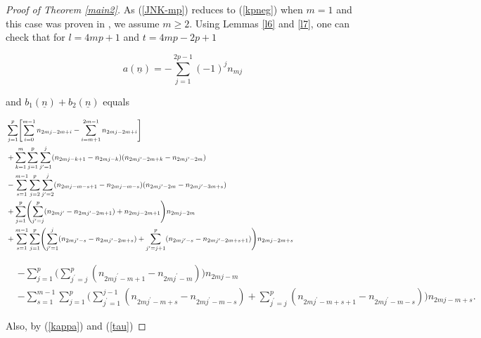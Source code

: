 \documentclass[11pt,reqno]{amsart}
\theoremstyle{definition}
\numberwithin{equation}{section}
\begin{document}
\begin{proof}[Proof of Theorem \ref{main2}]
As (\ref{JNK-mp}) reduces to (\ref{kpneg}) when $m=1$ and this case was proven in \cite{takata}, we assume $m \geq 2$. Using Lemmas \ref{l6} and \ref{l7}, one can check that for $l=4mp+1$ and $t=4mp-2p+1$

\begin{equation} \label{a1}
a({\underline{n}}) = - \sum_{j=1}^{2p - 1} (-1)^j n_{mj}
\end{equation}

\noindent and $b_1({\underline{n}}) + b_2({\underline{n}})$ equals

\begin{equation*}
\begin{aligned}
& \sum_{j=1}^{p} \Biggl[ \sum_{i=0}^{m-1} n_{2mj - 2m + i} - \sum_{i=m+1}^{2m-1} n_{2mj-2m+i} \Biggr] \\
& + \sum_{k=1}^{m} \sum_{j=1}^{p} \sum_{j^{\prime}=1}^{j} (n_{2mj-k+1} - n_{2mj-k})(n_{2mj^{\prime} - 2m + k} - n_{2mj^{\prime} - 2m})  \hphantom{xxxxxxxxxxxxxxxxxxxxxxxxxxxxxxxxxxxx} \\
& - \sum_{s=1}^{m-1} \sum_{j=2}^{p} \sum_{j^{\prime}=2}^{j} (n_{2mj - m - s +1} - n_{2mj-m-s})(n_{2mj^{\prime} - 2m} - n_{2mj^{\prime} - 3m+s}) \\
& + \sum_{j=1}^{p} \Biggl( \sum_{j^{\prime}=j}^{p} (n_{2mj^{\prime}} - n_{2mj^{\prime} - 2m + 1}) + n_{2mj - 2m +1} \Biggr) n_{2mj-2m} \\
& + \sum_{s=1}^{m-1} \sum_{j=1}^{p} \Biggl( \sum_{j^{\prime}=1}^{j} (n_{2mj^{\prime} - s} - n_{2mj^{\prime} - 2m + s}) + \sum_{j^{\prime}=j+1}^{p} (n_{2mj^{\prime} - s} - n_{2mj^{\prime} - 2m + s + 1}) \Biggr) n_{2mj-2m+s} \\
\end{aligned}
\end{equation*}

\begin{equation} \label{b1b2c1}
\begin{aligned}
& - \sum_{j=1}^{p} \Biggl( \sum_{j^{\prime}=j}^{p} (n_{2mj^{\prime} - m + 1} - n_{2mj^{\prime} - m}) \Biggr) n_{2mj-m} \\
& - \sum_{s=1}^{m-1} \sum_{j=1}^{p} \Biggl( \sum_{j^{\prime}=1}^{j-1} (n_{2mj^{\prime} - m + s} - n_{2mj^{\prime} - m - s}) + \sum_{j^{\prime}=j}^{p} (n_{2mj^{\prime} - m + s + 1} - n_{2mj^{\prime} - m - s} ) \Biggr) n_{2mj-m+s}. 
\end{aligned}
\end{equation}

\noindent Also, by (\ref{kappa}) and (\ref{tau})


\end{proof}
\end{document}
